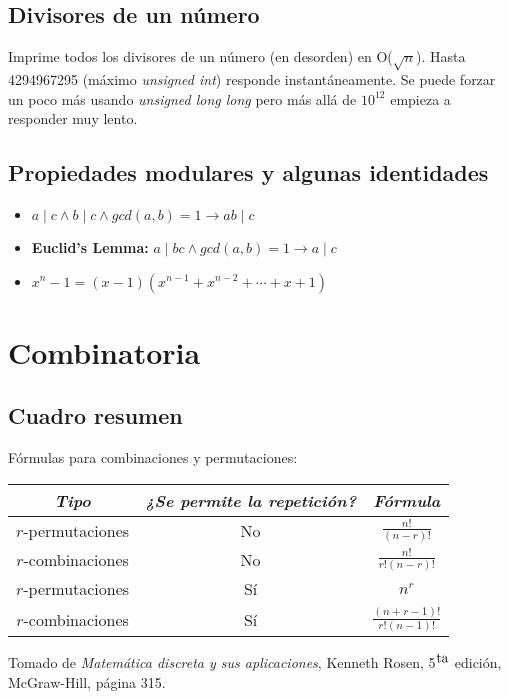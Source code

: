 \documentclass[10pt,letterpaper,twocolumn]{article}
\newcommand{\codigofuente}[1]{

\dotfill
}
\begin{document}
\subsection{Divisores de un número}
Imprime todos los divisores de un número (en desorden) en O($\sqrt{n}$).
Hasta 4294967295 (máximo \textit{unsigned int}) responde instantáneamente. Se puede
forzar un poco más usando \textit{unsigned long long} pero más allá de $10^{12}$ empieza a
responder muy lento.
\codigofuente{./src/teoria_de_numeros/divisores.cpp}

\subsection{Propiedades modulares y algunas identidades}

\begin{itemize}
  \item $ a \mid c \land b \mid c \land gcd(a, b) = 1 \rightarrow ab \mid c $
  \item \textbf{Euclid's Lemma:}  $ a \mid bc \land gcd(a, b) = 1 \rightarrow a \mid c $
  \item $ x^n - 1 = (x - 1)(x^{n - 1} + x^{n - 2} + \cdots + x + 1) $
\end{itemize}

\section{Combinatoria}
\subsection{Cuadro resumen}
Fórmulas para combinaciones y permutaciones:
\begin{center}
  \renewcommand{\arraystretch}{2} %
  \begin{tabular}{| c | c | c |}
    \hline
    \textit{Tipo} & \textit{¿Se permite la repetición?} & \textit{Fórmula} \\ [1.5ex]
    \hline\hline

    $r$-permutaciones & No & $ \displaystyle\frac{n!}{(n-r)!} $ \\ [1.5ex]
    \hline
    $r$-combinaciones & No & $ \displaystyle\frac{n!}{r!(n-r)!} $ \\  [1.5ex]
    \hline
    $r$-permutaciones & Sí & $ \displaystyle n^{r} $ \\
    \hline
    $r$-combinaciones & Sí & $ \displaystyle\frac{(n+r-1)!}{r!(n-1)!} $ \\ [1.5ex]
    \hline
  \end{tabular}
  \renewcommand{\arraystretch}{1}
\end{center}
Tomado de \textit{Matemática discreta y sus aplicaciones}, Kenneth Rosen, 5${}^{\hbox{ta}}$ edición, McGraw-Hill, página 315.
\end{document}
